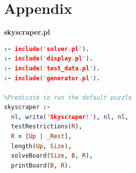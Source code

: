\documentclass{llncs}
\begin{document}
\clearpage

\appendix

\section{Appendix}

\huge\textbf{skyscraper.pl}
\begin{lstlisting}[language=Prolog]
:- include('solver.pl').
:- include('display.pl').
:- include('test_data.pl').
:- include('generator.pl').

%Predicate to run the default puzzle
skyscraper :-
  nl, write('Skyscraper!'), nl, nl,
  testRestrictions(R),
  R = [Up | _Rest],
  length(Up, Size),
  solveBoard(Size, B, R),
  printBoard(B, R).
\end{lstlisting}
\newpage
\end{document}
